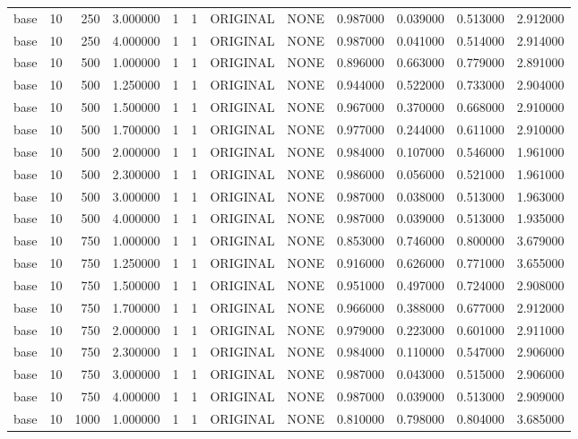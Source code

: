 \begin{tabular}{lrrrllllrrrr}
base & 10 & 250 & 3.000000 & 1 & 1 & ORIGINAL & NONE & 0.987000 & 0.039000 & 0.513000 & 2.912000 \\
base & 10 & 250 & 4.000000 & 1 & 1 & ORIGINAL & NONE & 0.987000 & 0.041000 & 0.514000 & 2.914000 \\
base & 10 & 500 & 1.000000 & 1 & 1 & ORIGINAL & NONE & 0.896000 & 0.663000 & 0.779000 & 2.891000 \\
base & 10 & 500 & 1.250000 & 1 & 1 & ORIGINAL & NONE & 0.944000 & 0.522000 & 0.733000 & 2.904000 \\
base & 10 & 500 & 1.500000 & 1 & 1 & ORIGINAL & NONE & 0.967000 & 0.370000 & 0.668000 & 2.910000 \\
base & 10 & 500 & 1.700000 & 1 & 1 & ORIGINAL & NONE & 0.977000 & 0.244000 & 0.611000 & 2.910000 \\
base & 10 & 500 & 2.000000 & 1 & 1 & ORIGINAL & NONE & 0.984000 & 0.107000 & 0.546000 & 1.961000 \\
base & 10 & 500 & 2.300000 & 1 & 1 & ORIGINAL & NONE & 0.986000 & 0.056000 & 0.521000 & 1.961000 \\
base & 10 & 500 & 3.000000 & 1 & 1 & ORIGINAL & NONE & 0.987000 & 0.038000 & 0.513000 & 1.963000 \\
base & 10 & 500 & 4.000000 & 1 & 1 & ORIGINAL & NONE & 0.987000 & 0.039000 & 0.513000 & 1.935000 \\
base & 10 & 750 & 1.000000 & 1 & 1 & ORIGINAL & NONE & 0.853000 & 0.746000 & 0.800000 & 3.679000 \\
base & 10 & 750 & 1.250000 & 1 & 1 & ORIGINAL & NONE & 0.916000 & 0.626000 & 0.771000 & 3.655000 \\
base & 10 & 750 & 1.500000 & 1 & 1 & ORIGINAL & NONE & 0.951000 & 0.497000 & 0.724000 & 2.908000 \\
base & 10 & 750 & 1.700000 & 1 & 1 & ORIGINAL & NONE & 0.966000 & 0.388000 & 0.677000 & 2.912000 \\
base & 10 & 750 & 2.000000 & 1 & 1 & ORIGINAL & NONE & 0.979000 & 0.223000 & 0.601000 & 2.911000 \\
base & 10 & 750 & 2.300000 & 1 & 1 & ORIGINAL & NONE & 0.984000 & 0.110000 & 0.547000 & 2.906000 \\
base & 10 & 750 & 3.000000 & 1 & 1 & ORIGINAL & NONE & 0.987000 & 0.043000 & 0.515000 & 2.906000 \\
base & 10 & 750 & 4.000000 & 1 & 1 & ORIGINAL & NONE & 0.987000 & 0.039000 & 0.513000 & 2.909000 \\
base & 10 & 1000 & 1.000000 & 1 & 1 & ORIGINAL & NONE & 0.810000 & 0.798000 & 0.804000 & 3.685000 \\

\end{tabular}
